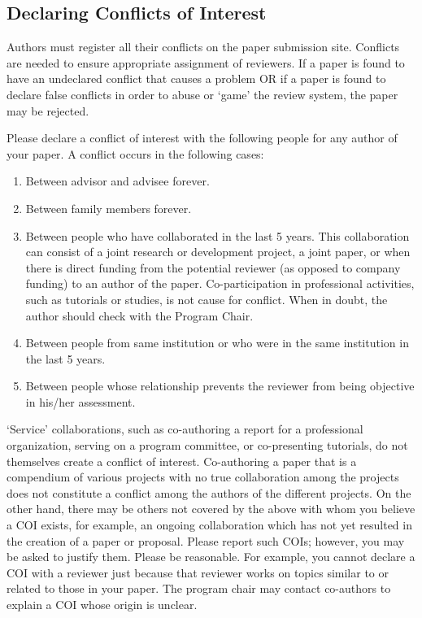 \documentclass[conference]{IEEEtran}
\begin{document}
\subsection{Declaring Conflicts of Interest}

Authors must register all their conflicts on the paper submission
site. Conflicts are needed to ensure appropriate assignment of
reviewers. If a paper is found to have an undeclared conflict that
causes a problem OR if a paper is found to declare false conflicts in
order to abuse or `game' the review system, the paper may be rejected.

Please declare a conflict of interest with the following people for any author of your paper.
A conflict occurs in the following cases:
\begin{enumerate}
\item Between advisor and advisee forever.
\item Between family members forever.
\item Between people who have collaborated in the last 5 years. This
  collaboration can consist of a joint research or development
  project, a joint paper, or when there is direct funding from the
  potential reviewer (as opposed to company funding) to an author of
  the paper. Co-participation in professional activities, such as
  tutorials or studies, is not cause for conflict. When in doubt, the
  author should check with the Program Chair.
\item Between people from same institution or who were in the same
  institution in the last 5 years.
\item Between people whose relationship prevents the reviewer from
  being objective in his/her assessment.
\end{enumerate}

`Service' collaborations, such as co-authoring a report for a
professional organization, serving on a program committee, or
co-presenting tutorials, do not themselves create a conflict of
interest. Co-authoring a paper that is a compendium of various
projects with no true collaboration among the projects does not
constitute a conflict among the authors of the different projects. On
the other hand, there may be others not covered by the above with whom
you believe a COI exists, for example, an ongoing collaboration which
has not yet resulted in the creation of a paper or proposal. Please
report such COIs; however, you may be asked to justify them. Please be
reasonable. For example, you cannot declare a COI with a reviewer just
because that reviewer works on topics similar to or related to those
in your paper.  The program chair may contact co-authors to explain a COI
whose origin is unclear.
\end{document}
